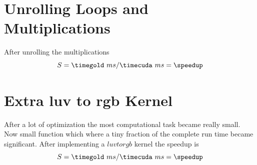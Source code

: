 \section{Unrolling Loops and Multiplications} %
\label{sec:unrolling_loops_and_multiplications}

After unrolling the multiplications 
\fpDiv{\speedup}{\timegold}{\timecuda}
\begin{equation*}\label{eq:speedup0}
	S = \timegold\ ms/\timecuda\ ms = \speedup
\end{equation*}

\section{Extra luv to rgb Kernel}

After a lot of optimization the most computational task became really small. Now
small function which where a tiny fraction of the complete run time became 
significant. 
After implementing a $luvtorgb$ kernel the speedup is 
\fpDiv{\speedup}{\timegold}{\timecuda}
\begin{equation*}\label{eq:speedup0}
	S = \timegold\ ms/\timecuda\ ms = \speedup
\end{equation*}













